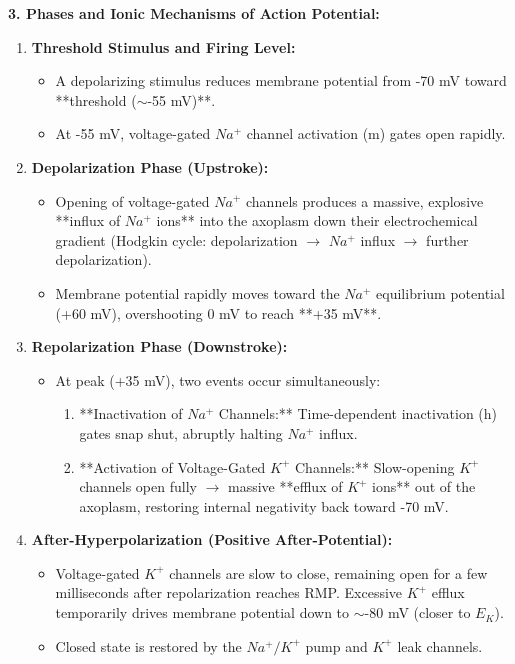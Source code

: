 \documentclass[11pt,a4paper]{article}
\begin{document}
\begin{ansbox}
\textbf{3. Phases and Ionic Mechanisms of Action Potential:}
\begin{enumerate}[leftmargin=*]
    \item \textbf{Threshold Stimulus and Firing Level:}
    \begin{itemize}
        \item A depolarizing stimulus reduces membrane potential from -70 mV toward **threshold ($\sim$-55 mV)**.
        \item At -55 mV, voltage-gated $Na^+$ channel activation (m) gates open rapidly.
    \end{itemize}
    \item \textbf{Depolarization Phase (Upstroke):}
    \begin{itemize}
        \item Opening of voltage-gated $Na^+$ channels produces a massive, explosive **influx of $Na^+$ ions** into the axoplasm down their electrochemical gradient (Hodgkin cycle: depolarization $\rightarrow$ $Na^+$ influx $\rightarrow$ further depolarization).
        \item Membrane potential rapidly moves toward the $Na^+$ equilibrium potential (+60 mV), overshooting 0 mV to reach **+35 mV**.
    \end{itemize}
    \item \textbf{Repolarization Phase (Downstroke):}
    \begin{itemize}
        \item At peak (+35 mV), two events occur simultaneously:
        \begin{enumerate}
            \item **Inactivation of $Na^+$ Channels:** Time-dependent inactivation (h) gates snap shut, abruptly halting $Na^+$ influx.
            \item **Activation of Voltage-Gated $K^+$ Channels:** Slow-opening $K^+$ channels open fully $\rightarrow$ massive **efflux of $K^+$ ions** out of the axoplasm, restoring internal negativity back toward -70 mV.
        \end{enumerate}
    \end{itemize}
    \item \textbf{After-Hyperpolarization (Positive After-Potential):}
    \begin{itemize}
        \item Voltage-gated $K^+$ channels are slow to close, remaining open for a few milliseconds after repolarization reaches RMP. Excessive $K^+$ efflux temporarily drives membrane potential down to $\sim$-80 mV (closer to $E_K$).
        \item Closed state is restored by the $Na^+/K^+$ pump and $K^+$ leak channels.
    \end{itemize}
\end{enumerate}


\end{ansbox}
\end{document}
